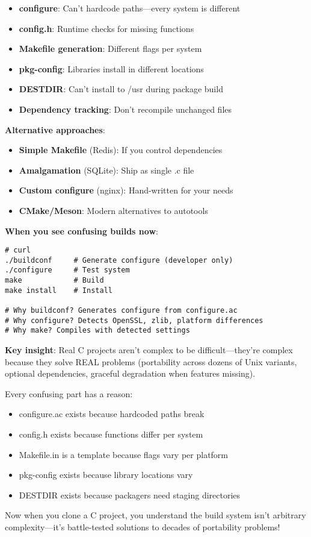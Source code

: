 \begin{itemize}
    \item \textbf{configure}: Can't hardcode paths—every system is different
    \item \textbf{config.h}: Runtime checks for missing functions
    \item \textbf{Makefile generation}: Different flags per system
    \item \textbf{pkg-config}: Libraries install in different locations
    \item \textbf{DESTDIR}: Can't install to /usr during package build
    \item \textbf{Dependency tracking}: Don't recompile unchanged files
\end{itemize}

\textbf{Alternative approaches}:

\begin{itemize}
    \item \textbf{Simple Makefile} (Redis): If you control dependencies
    \item \textbf{Amalgamation} (SQLite): Ship as single .c file
    \item \textbf{Custom configure} (nginx): Hand-written for your needs
    \item \textbf{CMake/Meson}: Modern alternatives to autotools
\end{itemize}

\textbf{When you see confusing builds now}:

\begin{lstlisting}
# curl
./buildconf     # Generate configure (developer only)
./configure     # Test system
make            # Build
make install    # Install

# Why buildconf? Generates configure from configure.ac
# Why configure? Detects OpenSSL, zlib, platform differences
# Why make? Compiles with detected settings
\end{lstlisting}

\textbf{Key insight}: Real C projects aren't complex to be difficult—they're complex because they solve REAL problems (portability across dozens of Unix variants, optional dependencies, graceful degradation when features missing).

Every confusing part has a reason:
\begin{itemize}
    \item configure.ac exists because hardcoded paths break
    \item config.h exists because functions differ per system
    \item Makefile.in is a template because flags vary per platform
    \item pkg-config exists because library locations vary
    \item DESTDIR exists because packagers need staging directories
\end{itemize}

Now when you clone a C project, you understand the build system isn't arbitrary complexity—it's battle-tested solutions to decades of portability problems!
